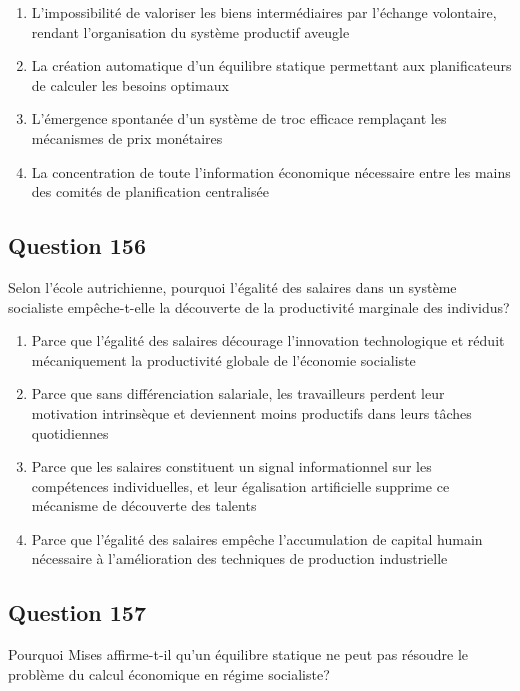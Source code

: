 \documentclass[12pt,a4paper]{article}
\begin{document}
\begin{enumerate}[label=\Alph*., leftmargin=*]
\item L'impossibilité de valoriser les biens intermédiaires par l'échange volontaire, rendant l'organisation du système productif aveugle
\item La création automatique d'un équilibre statique permettant aux planificateurs de calculer les besoins optimaux
\item L'émergence spontanée d'un système de troc efficace remplaçant les mécanismes de prix monétaires
\item La concentration de toute l'information économique nécessaire entre les mains des comités de planification centralisée
\end{enumerate}

\bigskip


\subsection*{Question 156}
Selon l'école autrichienne, pourquoi l'égalité des salaires dans un système socialiste empêche-t-elle la découverte de la productivité marginale des individus?

\begin{enumerate}[label=\Alph*., leftmargin=*]
\item Parce que l'égalité des salaires décourage l'innovation technologique et réduit mécaniquement la productivité globale de l'économie socialiste
\item Parce que sans différenciation salariale, les travailleurs perdent leur motivation intrinsèque et deviennent moins productifs dans leurs tâches quotidiennes
\item Parce que les salaires constituent un signal informationnel sur les compétences individuelles, et leur égalisation artificielle supprime ce mécanisme de découverte des talents
\item Parce que l'égalité des salaires empêche l'accumulation de capital humain nécessaire à l'amélioration des techniques de production industrielle
\end{enumerate}

\bigskip


\subsection*{Question 157}
Pourquoi Mises affirme-t-il qu'un équilibre statique ne peut pas résoudre le problème du calcul économique en régime socialiste?
\end{document}
